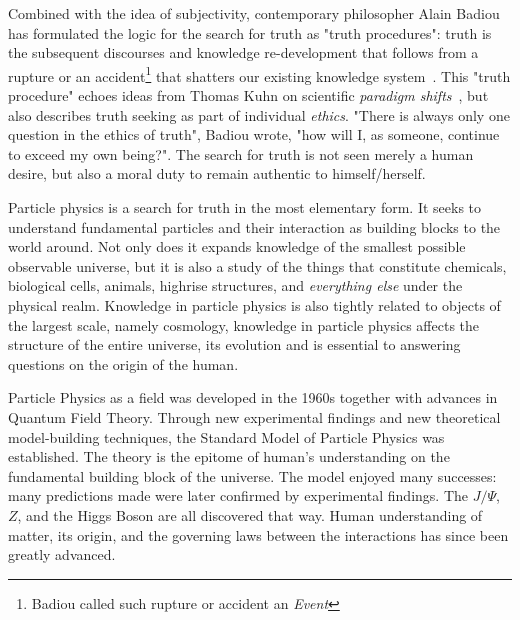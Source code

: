 Combined with the idea of subjectivity, contemporary philosopher Alain Badiou has formulated the logic for the search for truth as "truth procedures": truth is the subsequent discourses and knowledge re-development that follows from a rupture or an accident\footnote{Badiou called such rupture or accident an \textit{Event}} that shatters our existing knowledge system~\cite{badiou2007being}. This "truth procedure" echoes ideas from Thomas Kuhn on scientific \textit{paradigm
shifts}~\cite{kuhn2021structure}, but also describes truth seeking as part of individual \textit{ethics}. "There is always only one question in the ethics of truth", Badiou wrote, "how will I, as someone, continue to exceed my own being?"\cite{badiou2002ethics}. The search for truth is not seen merely a human desire, but also a moral duty to remain authentic to himself/herself.


Particle physics is a search for truth in the most elementary form. It seeks to understand fundamental particles and their interaction as building blocks to the world around. Not only does it expands knowledge of the smallest possible observable universe, but it is also a study of the things that constitute chemicals, biological cells, animals, highrise structures, and \textit{everything else} under the physical realm. Knowledge in particle physics is also tightly related to objects of the largest scale, namely cosmology, knowledge in particle physics affects the structure of the entire universe, its evolution and is essential to answering questions on the origin of the human.

Particle Physics as a field was developed in the 1960s together with advances in Quantum Field Theory. Through new experimental findings and new theoretical model-building techniques, the Standard Model of Particle Physics was established. The theory is the epitome of human's understanding on the fundamental building block of the universe. The model enjoyed many successes: many predictions made were later confirmed by experimental findings. The $J/\Psi$, $Z$, and the Higgs Boson are all discovered that way. Human
understanding of matter, its origin, and the governing laws between the interactions has since been greatly advanced. 

